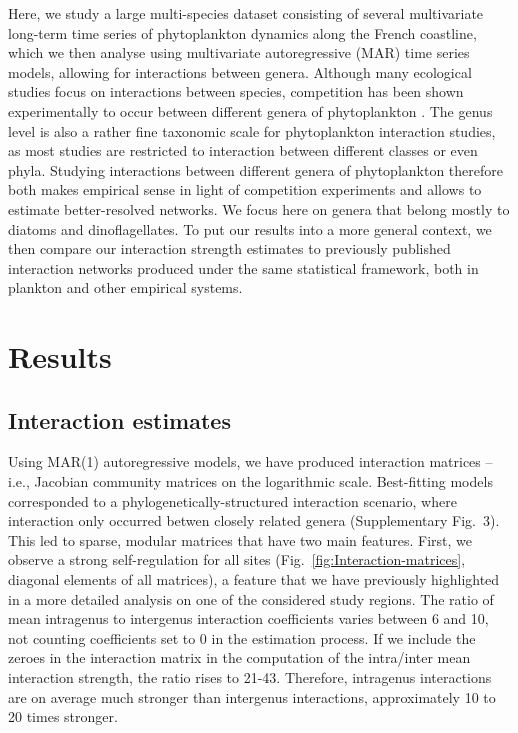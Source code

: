 \documentclass[9pt,twocolumn,twoside,lineno]{pnas-new}
\begin{document}
Here, we study a large multi-species dataset consisting of several
multivariate long-term time series of phytoplankton dynamics along
the French coastline, which we then analyse using multivariate autoregressive
(MAR) time series models, allowing for interactions between genera.
Although many ecological studies focus on interactions between species,
competition has been shown experimentally to occur between different
genera of phytoplankton \cite{titman_ecological_1976,descamps-julien_stable_2005}.
The genus level is also a rather fine taxonomic scale for phytoplankton
interaction studies, as most studies are restricted to interaction
between different classes or even phyla\cite{ives_estimating_2003,hampton_sixty_2008,griffiths_phytoplankton_2015}.
Studying interactions between different genera of phytoplankton therefore
both makes empirical sense in light of competition experiments and
allows to estimate better-resolved networks. We focus here on genera
that belong mostly to diatoms and dinoflagellates. To put our results
into a more general context, we then compare our interaction strength
estimates to previously published interaction networks produced under
the same statistical framework, both in plankton and other empirical
systems. 


\section*{Results}
\subsection*{Interaction estimates}
Using MAR(1) autoregressive models, we have produced interaction matrices\cite{ives_estimating_2003,hampton2013quantifying}
-- i.e., Jacobian community matrices on the logarithmic scale\cite{ives_estimating_2003}.
Best-fitting models corresponded to a phylogenetically-structured
interaction scenario, where interaction only occurred betwen closely
related genera (Supplementary Fig.~3). This led to sparse, modular
matrices that have two main features. First, we observe a strong self-regulation
for all sites (Fig.~\ref{fig:Interaction-matrices}, diagonal elements
of all matrices), a feature that we have previously highlighted in
a more detailed analysis on one of the considered study regions\cite{barraquand_coastal_2018}.
The ratio of mean intragenus to intergenus interaction coefficients
varies between 6 and 10, not counting coefficients set to 0 in the
estimation process. If we include the zeroes in the interaction matrix
in the computation of the intra/inter mean interaction strength, the
ratio rises to 21-43. Therefore, intragenus interactions are on average
much stronger than intergenus interactions, approximately 10 to 20
times stronger.
\end{document}
